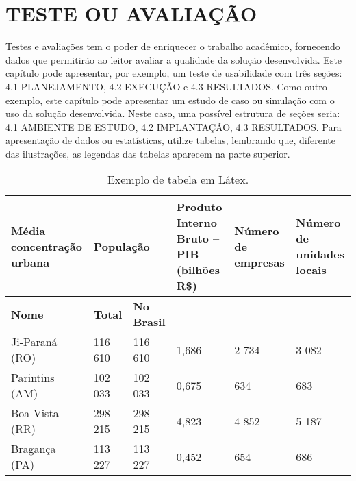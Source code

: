 \chapter{TESTE OU AVALIAÇÃO} \label{cap:teste}

Testes e avaliações tem o poder de enriquecer o trabalho acadêmico, fornecendo dados que permitirão ao leitor avaliar a qualidade da solução desenvolvida. Este capítulo pode apresentar, por exemplo, um teste de usabilidade com três seções: 4.1 PLANEJAMENTO, 4.2 EXECUÇÃO e 4.3 RESULTADOS.
Como outro exemplo, este capítulo pode apresentar um estudo de caso ou simulação com o uso da solução desenvolvida. Neste caso, uma possível estrutura de seções seria: 4.1 AMBIENTE DE ESTUDO, 4.2 IMPLANTAÇÃO, 4.3 RESULTADOS.
Para apresentação de dados ou estatísticas, utilize tabelas, lembrando que, diferente das ilustrações, as legendas das tabelas aparecem na parte superior.

\begin{table}[htb]
	\ABNTEXfontereduzida
	\caption{\label{tab:Tab_1}Exemplo de tabela em Látex.}
	\begin{tabular}{@{}p{3.0cm}p{1.5cm}p{2cm}p{2.5cm}p{2.5cm}p{2.5cm}@{}}
		\toprule
		\textbf{Média concentração urbana} & \multicolumn{2}{l}{\textbf{População}} & \textbf{Produto Interno Bruto – PIB (bilhões R\$)} & \textbf{Número de empresas} & \textbf{Número de unidades locais} \\ \midrule
		\textbf{Nome}                      & \textbf{Total}   & \textbf{No Brasil}  &                                                   &                             & \\
		Ji-Paraná (RO)                     & 116 610          & 116 610             & 1,686                                             & 2 734                       & 3 082 \\
		Parintins (AM)                     & 102 033          & 102 033             & 0,675                                             & 634                         & 683 \\
		Boa Vista (RR)                     & 298 215          & 298 215             & 4,823                                             & 4 852                       & 5 187 \\
		Bragança (PA)                      & 113 227          & 113 227             & 0,452                                             & 654                         & 686 \\ \bottomrule
	\end{tabular}
\end{table}